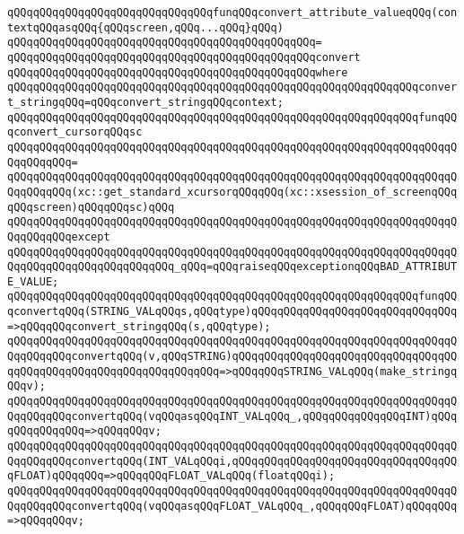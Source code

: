 \verb|qQQqqQQqqQQqqQQqqQQqqQQqqQQqqQQqfunqQQqconvert_attribute_valueqQQq(contextqQQqasqQQq{qQQqscreen,qQQq...qQQq}qQQq)|\newline
\verb|qQQqqQQqqQQqqQQqqQQqqQQqqQQqqQQqqQQqqQQqqQQqqQQq=|\newline
\verb|qQQqqQQqqQQqqQQqqQQqqQQqqQQqqQQqqQQqqQQqqQQqqQQqconvert|\newline
\verb|qQQqqQQqqQQqqQQqqQQqqQQqqQQqqQQqqQQqqQQqqQQqqQQqwhere|\newline
\verb|qQQqqQQqqQQqqQQqqQQqqQQqqQQqqQQqqQQqqQQqqQQqqQQqqQQqqQQqqQQqqQQqconvert_stringqQQq=qQQqconvert_stringqQQqcontext;|\newline
\newline
\verb|qQQqqQQqqQQqqQQqqQQqqQQqqQQqqQQqqQQqqQQqqQQqqQQqqQQqqQQqqQQqqQQqfunqQQqconvert_cursorqQQqsc|\newline
\verb|qQQqqQQqqQQqqQQqqQQqqQQqqQQqqQQqqQQqqQQqqQQqqQQqqQQqqQQqqQQqqQQqqQQqqQQqqQQqqQQq=|\newline
\verb|qQQqqQQqqQQqqQQqqQQqqQQqqQQqqQQqqQQqqQQqqQQqqQQqqQQqqQQqqQQqqQQqqQQqqQQqqQQqqQQq(xc::get_standard_xcursorqQQqqQQq(xc::xsession_of_screenqQQqqQQqscreen)qQQqqQQqsc)qQQq|\newline
\verb|qQQqqQQqqQQqqQQqqQQqqQQqqQQqqQQqqQQqqQQqqQQqqQQqqQQqqQQqqQQqqQQqqQQqqQQqqQQqqQQqexcept|\newline
\verb|qQQqqQQqqQQqqQQqqQQqqQQqqQQqqQQqqQQqqQQqqQQqqQQqqQQqqQQqqQQqqQQqqQQqqQQqqQQqqQQqqQQqqQQqqQQqqQQq_qQQq=qQQqraiseqQQqexceptionqQQqBAD_ATTRIBUTE_VALUE;|\newline
\newline
\verb|qQQqqQQqqQQqqQQqqQQqqQQqqQQqqQQqqQQqqQQqqQQqqQQqqQQqqQQqqQQqqQQqfunqQQqconvertqQQq(STRING_VALqQQqs,qQQqtype)qQQqqQQqqQQqqQQqqQQqqQQqqQQqqQQq=>qQQqqQQqconvert_stringqQQq(s,qQQqtype);|\newline
\verb|qQQqqQQqqQQqqQQqqQQqqQQqqQQqqQQqqQQqqQQqqQQqqQQqqQQqqQQqqQQqqQQqqQQqqQQqqQQqqQQqconvertqQQq(v,qQQqSTRING)qQQqqQQqqQQqqQQqqQQqqQQqqQQqqQQqqQQqqQQqqQQqqQQqqQQqqQQqqQQqqQQqqQQq=>qQQqqQQqSTRING_VALqQQq(make_stringqQQqv);|\newline
\verb|qQQqqQQqqQQqqQQqqQQqqQQqqQQqqQQqqQQqqQQqqQQqqQQqqQQqqQQqqQQqqQQqqQQqqQQqqQQqqQQqconvertqQQq(vqQQqasqQQqINT_VALqQQq_,qQQqqQQqqQQqqQQqINT)qQQqqQQqqQQqqQQq=>qQQqqQQqv;|\newline
\verb|qQQqqQQqqQQqqQQqqQQqqQQqqQQqqQQqqQQqqQQqqQQqqQQqqQQqqQQqqQQqqQQqqQQqqQQqqQQqqQQqconvertqQQq(INT_VALqQQqi,qQQqqQQqqQQqqQQqqQQqqQQqqQQqqQQqqQQqFLOAT)qQQqqQQq=>qQQqqQQqFLOAT_VALqQQq(floatqQQqi);|\newline
\verb|qQQqqQQqqQQqqQQqqQQqqQQqqQQqqQQqqQQqqQQqqQQqqQQqqQQqqQQqqQQqqQQqqQQqqQQqqQQqqQQqconvertqQQq(vqQQqasqQQqFLOAT_VALqQQq_,qQQqqQQqFLOAT)qQQqqQQq=>qQQqqQQqv;|\newline

